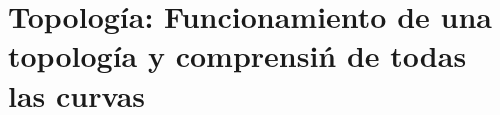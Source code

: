 \documentclass[e4_tp1_main.tex]{subfiles}
\begin{document}
\section{Topolog\'ia: Funcionamiento de una topolog\'ia y comprensi\'n de todas las curvas}
\newpage
\end{document}
